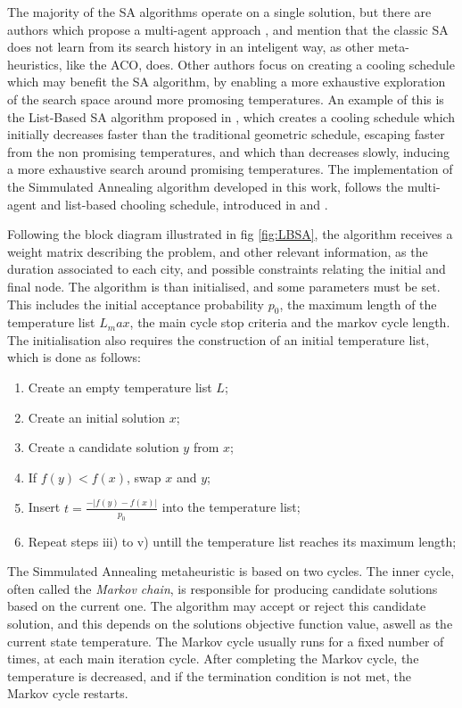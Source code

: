 The majority of the SA algorithms operate on a single solution, but there are authors which 
propose a multi-agent approach \cite{multi_agent_SA}, and mention that the classic 
SA does not learn from its search history in an inteligent way, as other meta-heuristics, like the ACO, does.
Other authors focus on creating a cooling schedule which may benefit the SA algorithm, 
by enabling a more exhaustive exploration of the search space around more promosing temperatures.
An example of this is the List-Based SA algorithm proposed in \cite{list_based_SA},
which creates a cooling schedule which initially decreases faster than the traditional geometric schedule,
escaping faster from the non promising temperatures, and which than decreases slowly,
inducing a more exhaustive search around promising temperatures.  
The implementation of the Simmulated Annealing algorithm developed in this work,
follows the multi-agent and list-based chooling schedule, introduced in \cite{multi_agent_SA} and \cite{list_based_SA}.

Following the block diagram illustrated in fig \ref{fig:LBSA}, 
the algorithm receives a weight matrix describing the problem, and other relevant information,
as the duration associated to each city, and possible constraints relating the initial and final node.
The algorithm is than initialised, and some parameters must be set. This includes the initial acceptance probability $p_0$,
the maximum length of the temperature list $L_max$, the main cycle stop criteria and the markov cycle length.
The initialisation also requires the construction of an initial temperature list, which is done as follows: 

\begin{enumerate}[noitemsep,topsep=0pt,parsep=0pt,partopsep=0pt]
  \item Create an empty temperature list $L$;
  \item Create an initial solution $x$; 
  \item Create a candidate solution $y$ from $x$;
  \item If $f(y) < f(x)$, swap $x$ and $y$;
  \item Insert $t = \frac{-|f(y)-f(x)|}{p_0}$ into the temperature list;
  \item Repeat steps iii) to v) untill the temperature list reaches its maximum length;  
\end{enumerate}


The Simmulated Annealing metaheuristic is based on two cycles.
The inner cycle, often called the \textit{Markov chain},
is responsible for producing candidate solutions based on the current one.
The algorithm may accept or reject this candidate solution,
and this depends on the solutions objective function value, aswell as the current state temperature.
The Markov cycle usually runs for a fixed number of times, at each main iteration cycle.
After completing the Markov cycle, the temperature is decreased, 
and if the termination condition is not met, the Markov cycle restarts.

